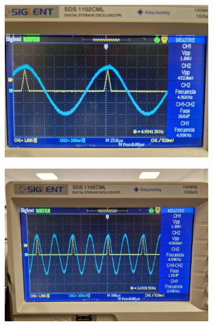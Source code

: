 \documentclass[a4paper,12pt,titlepage]{article}
\begin{document}
\begin{figure}[h!]
    \centering
    \begin{subfigure}{0.45\textwidth}
        \centering
        \includegraphics[width=1.05\linewidth]{fourier/delta_dirac/delta1.jpg}
        \label{fig:subfig1}
    \end{subfigure}
    \hfill
    \begin{subfigure}{0.45\textwidth}
        \centering
        \includegraphics[width=1.05\linewidth]{fourier/delta_dirac/delta2.jpg}
        \label{fig:subfig2}
    \end{subfigure}
    \\
    \begin{subfigure}{0.45\textwidth}

\end{subfigure}
\end{figure}
\end{document}
